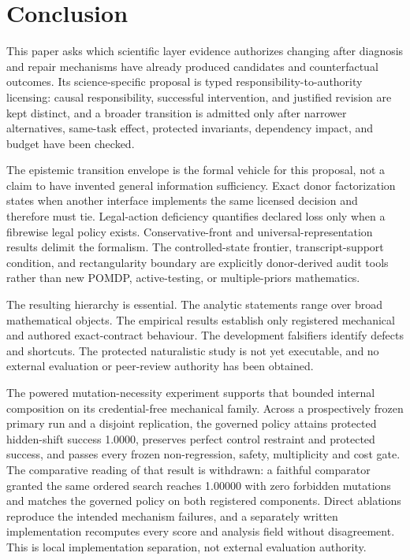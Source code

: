 \section{Conclusion}

This paper asks which scientific layer evidence authorizes changing after
diagnosis and repair mechanisms have already produced candidates and
counterfactual outcomes. Its science-specific proposal is typed
responsibility-to-authority licensing: causal responsibility, successful
intervention, and justified revision are kept distinct, and a broader
transition is admitted only after narrower alternatives, same-task effect,
protected invariants, dependency impact, and budget have been checked.

The epistemic transition envelope is the formal vehicle for this proposal, not
a claim to have invented general information sufficiency. Exact donor
factorization states when another interface implements the same licensed
decision and therefore must tie. Legal-action deficiency quantifies declared
loss only when a fibrewise legal policy exists. Conservative-front and
universal-representation results delimit the formalism. The controlled-state
frontier, transcript-support condition, and rectangularity boundary are
explicitly donor-derived audit tools rather than new POMDP, active-testing, or
multiple-priors mathematics.

The resulting hierarchy is essential. The analytic statements range over broad
mathematical objects. The empirical results establish only registered
mechanical and authored exact-contract behaviour. The development falsifiers
identify defects and shortcuts. The protected naturalistic study is not yet
executable, and no external evaluation or peer-review authority has been
obtained.

The powered mutation-necessity experiment supports that bounded internal composition on
its credential-free mechanical family. Across a prospectively frozen primary run
and a disjoint replication, the governed policy attains protected hidden-shift
success 1.0000, preserves perfect control restraint and protected success, and
passes every frozen non-regression, safety, multiplicity and cost gate. The
comparative reading of that result is withdrawn: a faithful comparator granted
the same ordered search reaches 1.00000 with zero forbidden mutations and matches
the governed policy on both registered components. Direct ablations reproduce the intended mechanism
failures, and a separately written implementation recomputes every score and
analysis field without disagreement. This is local implementation separation,
not external evaluation authority.


